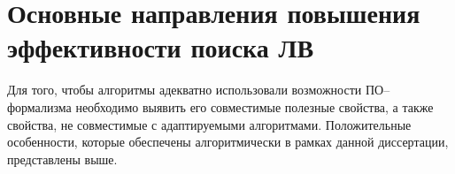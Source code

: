 \section{Основные направления повышения эффективности поиска ЛВ}
Для того, чтобы алгоритмы адекватно использовали возможности ПО--формализма необходимо выявить его совместимые полезные свойства, а также свойства, не совместимые с адаптируемыми алгоритмами.  Положительные особенности, которые обеспечены алгоритмически в рамках данной диссертации, представлены выше.

